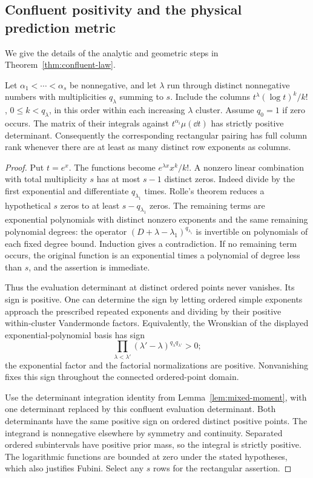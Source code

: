 \subsection{Confluent positivity and the physical prediction metric}
We give the details of the analytic and geometric steps in
Theorem~\ref{thm:confluent-law}.

\begin{lemma}\label{lem:confluent-positive}
Let $\alpha_1<\cdots<\alpha_s$ be nonnegative, and let $\lambda$ run
through distinct nonnegative numbers with multiplicities $q_\lambda$
summing to $s$. Include the columns
$t^\lambda(\log t)^k/k!$, $0\le k<q_\lambda$, in this order within
each increasing $\lambda$ cluster. Assume $q_0=1$ if zero occurs.
The matrix of their integrals against $t^{\alpha_i}\mu(\dd t)$ has
strictly positive determinant. Consequently the corresponding rectangular
pairing has full column rank whenever there are at least as many distinct
row exponents as columns.
\end{lemma}
\begin{proof}
Put $t=e^x$. The functions become $e^{\lambda x}x^k/k!$.
A nonzero linear combination with total multiplicity $s$ has at most
$s-1$ distinct zeros. Indeed divide by the first exponential and
differentiate $q_{\lambda_1}$ times. Rolle's theorem reduces a hypothetical
$s$ zeros to at least $s-q_{\lambda_1}$ zeros. The remaining terms are
exponential polynomials with distinct nonzero exponents and the same
remaining polynomial degrees: the operator $(D+\lambda-\lambda_1)^{q_{\lambda_1}}$
is invertible on polynomials of each fixed degree bound. Induction gives
a contradiction. If no remaining term occurs, the original function is
an exponential times a polynomial of degree less than $s$, and the
assertion is immediate.

Thus the evaluation determinant at distinct ordered points never
vanishes. Its sign is positive. One can determine the sign by letting
ordered simple exponents approach the prescribed repeated exponents and
dividing by their positive within-cluster Vandermonde factors. Equivalently,
the Wronskian of the displayed exponential-polynomial basis has sign
\[
 \prod_{\lambda<\lambda'}(\lambda'-\lambda)^{q_\lambda q_{\lambda'}}>0;
\]
the exponential factor and the factorial normalizations are positive.
Nonvanishing fixes this sign throughout the connected ordered-point domain.

Use the determinant integration identity from
Lemma~\ref{lem:mixed-moment}, with one determinant replaced by this
confluent evaluation determinant. Both determinants have the same positive
sign on ordered distinct positive points. The integrand is nonnegative
elsewhere by symmetry and continuity. Separated ordered subintervals have
positive prior mass, so the integral is strictly positive. The logarithmic
functions are bounded at zero under the stated hypotheses, which also
justifies Fubini. Select any $s$ rows for the rectangular assertion.
\end{proof}

